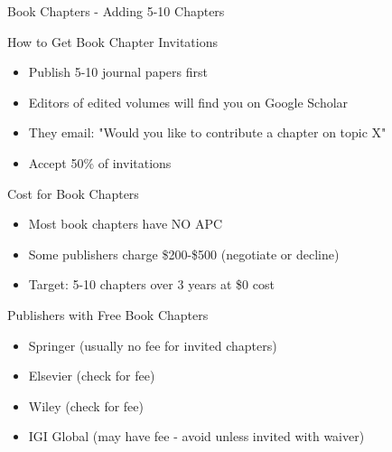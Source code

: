 \documentclass[11pt]{beamer}
\begin{document}
	\begin{frame}{Book Chapters - Adding 5-10 Chapters}
		\scriptsize
		\begin{block}{How to Get Book Chapter Invitations}
			\begin{itemize}
				\item Publish 5-10 journal papers first
				\item Editors of edited volumes will find you on Google Scholar
				\item They email: "Would you like to contribute a chapter on topic X"
				\item Accept 50\% of invitations
			\end{itemize}
		\end{block}
		\begin{block}{Cost for Book Chapters}
			\begin{itemize}
				\item Most book chapters have NO APC
				\item Some publishers charge \$200-\$500 (negotiate or decline)
				\item Target: 5-10 chapters over 3 years at \$0 cost
			\end{itemize}
		\end{block}
		\begin{block}{Publishers with Free Book Chapters}
			\begin{itemize}
				\item Springer (usually no fee for invited chapters)
				\item Elsevier (check for fee)
				\item Wiley (check for fee)
				\item IGI Global (may have fee - avoid unless invited with waiver)
			\end{itemize}
		\end{block}
	\end{frame}
	
\end{document}
